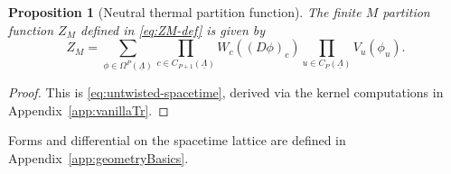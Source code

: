 \documentclass[dvipsnames,a4paper]{article}
\numberwithin{equation}{section}
\newtheorem{prop}[theorem]{Proposition}
\theoremstyle{definition}
\theoremstyle{remark}
\begin{document}
\begin{prop}[Neutral thermal partition function] The finite $M$ partition function $Z_M$ defined in \eqref{eq:ZM-def} is given by
	\begin{equation}
		Z_M
		=
		\sum_{\phi\in\Omega^P(\underline\Lambda)}
		\prod_{c\in C_{P+1}(\underline\Lambda)}
		W_c\left((D\phi)_c\right)
		\prod_{u\in C_P(\underline\Lambda)}
		V_u(\phi_u).
		\label{eq:Z-0}
	\end{equation}
\end{prop}
\begin{proof}
	This is \eqref{eq:untwisted-spacetime}, derived via the kernel computations in Appendix~\ref{app:vanillaTr}.
\end{proof}
Forms and differential on the spacetime lattice are defined in Appendix~\ref{app:geometryBasics}.
\end{document}
